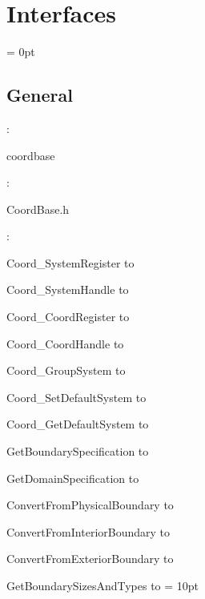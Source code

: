 
\section{Interfaces} 


\parskip = 0pt

\vspace{3mm} \subsection*{General}

: 

coordbase
\vspace{2mm}

\vspace{5mm}

: 



CoordBase.h
\vspace{2mm}

: 



Coord\_SystemRegister to 

Coord\_SystemHandle to 

Coord\_CoordRegister to 

Coord\_CoordHandle to 

Coord\_GroupSystem to 

Coord\_SetDefaultSystem to 

Coord\_GetDefaultSystem to 

GetBoundarySpecification to 

GetDomainSpecification to 

ConvertFromPhysicalBoundary to 

ConvertFromInteriorBoundary to 

ConvertFromExteriorBoundary to 

GetBoundarySizesAndTypes to 
\vspace{2mm}\parskip = 10pt 
